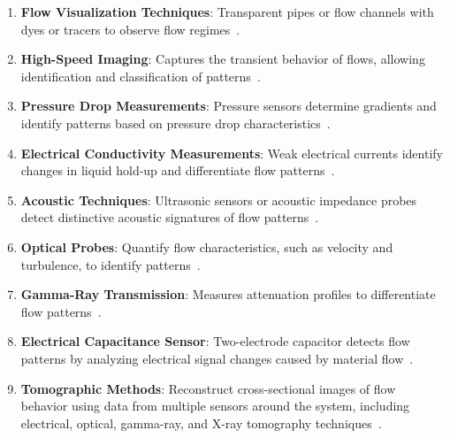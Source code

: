 \begin{enumerate} 
    \item \textbf{Flow Visualization Techniques}: Transparent pipes or flow channels with dyes or tracers to observe flow regimes~\cite{al2020systematic,al2020bsimplified,tsubone2001effects,almutairi2020ect}.
    
    \item \textbf{High-Speed Imaging}: Captures the transient behavior of flows, allowing identification and classification of patterns~\cite{somchai2006flow,ito2001flow,bennett2006frequency,xia1996two,clarke2001study,van2001evolution}.
    
    \item \textbf{Pressure Drop Measurements}: Pressure sensors determine gradients and identify patterns based on pressure drop characteristics~\cite{matsui1984identification,matsui1986identification,spedding1993flow,samways1997pressure,li2002experiment}.
    
    \item \textbf{Electrical Conductivity Measurements}: Weak electrical currents identify changes in liquid hold-up and differentiate flow patterns~\cite{hernandez2006fast,lamb1960measurement,van1985void,liu1993bstructure,jin2008design}.
    
    \item \textbf{Acoustic Techniques}: Ultrasonic sensors or acoustic impedance probes detect distinctive acoustic signatures of flow patterns~\cite{albion2007flow,xu2000acoustic,chung2004sound,gadiyaram2005acoustic}.
    
    \item \textbf{Optical Probes}: Quantify flow characteristics, such as velocity and turbulence, to identify patterns~\cite{yoon2006gas,polonsky1999relation,tu2002methodology,nydal1992statistical,andreussi1993void,martin2000slug}.
    
    \item \textbf{Gamma-Ray Transmission}: Measures attenuation profiles to differentiate flow patterns~\cite{xie2003flow,tortora2004capacitance,simons1995imaging,bieberle2006evaluation,hanus2022investigation}.
    
    \item \textbf{Electrical Capacitance Sensor}: Two-electrode capacitor detects flow patterns by analyzing electrical signal changes caused by material flow~\cite{williams1995process,abouelwafa1980use,geraets1988capacitance,tollefesn1998capacitance}.
    
    \item \textbf{Tomographic Methods}: Reconstruct cross-sectional images of flow behavior using data from multiple sensors around the system, including electrical, optical, gamma-ray, and X-ray tomography techniques~\cite{simons1995imaging,gamio2005visualisation,makkawi2002fluidization,reinecke1997multielectrode,yang2004adaptive,warsito2001measurement,dong2003application,ma2001application,lee2014electrical}.

\end{enumerate}



